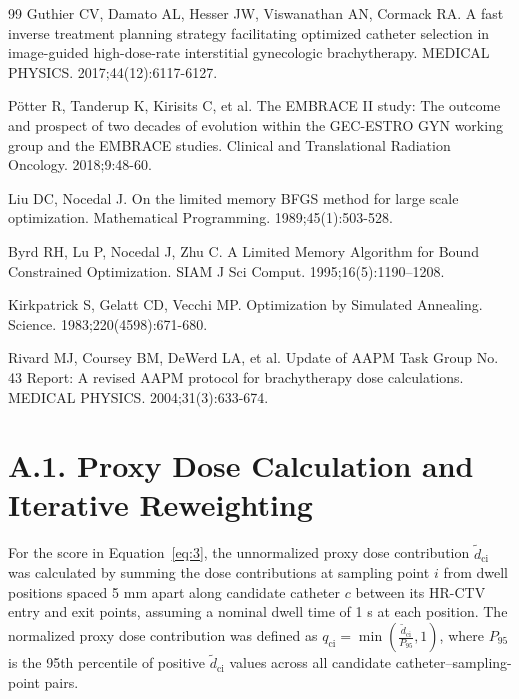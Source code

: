 \documentclass[12pt,twoside,letterpaper]{article}
\begin{document}
\begin{thebibliography}{99}
 Guthier CV, Damato AL, Hesser JW, Viswanathan AN, Cormack RA. A fast inverse treatment planning strategy facilitating optimized catheter selection in image-guided high-dose-rate interstitial gynecologic brachytherapy. MEDICAL PHYSICS. 2017;44(12):6117-6127.

 Pötter R, Tanderup K, Kirisits C, et al. The EMBRACE II study: The outcome and prospect of two decades of evolution within the GEC-ESTRO GYN working group and the EMBRACE studies. Clinical and Translational Radiation Oncology. 2018;9:48-60.

 Liu DC, Nocedal J. On the limited memory BFGS method for large scale optimization. Mathematical Programming. 1989;45(1):503-528.

 Byrd RH, Lu P, Nocedal J, Zhu C. A Limited Memory Algorithm for Bound Constrained Optimization. SIAM J Sci Comput. 1995;16(5):1190--1208.

 Kirkpatrick S, Gelatt CD, Vecchi MP. Optimization by Simulated Annealing. Science. 1983;220(4598):671-680.

 Rivard MJ, Coursey BM, DeWerd LA, et al. Update of AAPM Task Group No. 43 Report: A revised AAPM protocol for brachytherapy dose calculations. MEDICAL PHYSICS. 2004;31(3):633-674.

\end{thebibliography}

\endgroup



\clearpage




\section*{A.1. Proxy Dose Calculation and Iterative Reweighting}

For the score in Equation~\eqref{eq:3}, the unnormalized proxy dose contribution ${\widetilde{d}}_{\text{ci}}$ was calculated by summing the dose contributions at sampling point $i$ from dwell positions spaced 5 mm apart along candidate catheter $c$ between its HR-CTV entry and exit points, assuming a nominal dwell time of 1 s at each position. The normalized proxy dose contribution was defined as $q_{\text{ci}} = \min\left( \frac{{\widetilde{d}}_{\text{ci}}}{P_{95}},1 \right)$, where $P_{95}$ is the 95th percentile of positive ${\widetilde{d}}_{\text{ci}}$ values across all candidate catheter--sampling-point pairs.
\end{document}
